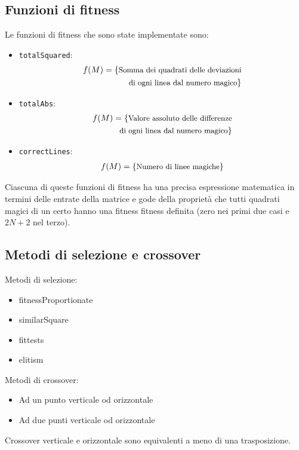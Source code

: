 \documentclass[italian,twoside,twocolumn]{article}
\begin{document}
\subsection{Funzioni di fitness}
Le funzioni di fitness che sono state implementate sono: 
\begin{itemize}
	\item \texttt{totalSquared}:
	\begin{align*} f(M) =  \{\text{\small Somma dei quadrati delle deviazioni} \\ \text{\small di ogni linea dal numero magico} \}
	\end{align*}
	\item \texttt{totalAbs}:
	\begin{align*} f(M) =  \{\text{\small Valore assoluto delle differenze} \\ \text{\small di ogni linea dal numero magico} \}
	\end{align*}	
	\item \texttt{correctLines}:
	\begin{align*} f(M) =  \{\text{\small Numero di linee magiche} \}
	\end{align*}	
\end{itemize}
Ciascuna di queste funzioni di fitness ha una precisa espressione matematica in termini delle entrate della matrice e gode della proprietà che tutti quadrati magici di un certo hanno una fitness fitness definita (zero nei primi due casi e $ 2N + 2 $ nel terzo). 

\subsection{Metodi di selezione e crossover}
Metodi di selezione:
\begin{itemize}
	\item fitnessProportionate
	\item similarSquare
	\item fittests
	\item elitism
\end{itemize}
Metodi di crossover:
\begin{itemize}
	\item Ad un punto verticale od orizzontale
	\item Ad due punti verticale od orizzontale
\end{itemize}

Crossover verticale e orizzontale sono equivalenti a meno di una trasposizione.
\end{document}
